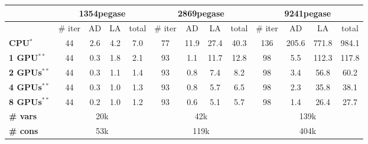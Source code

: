 \begin{tabular}{|l|cccc|cccc|cccc|}
  \hline
  &
    \multicolumn{4}{c|}{\bf 1354pegase}
  &
    \multicolumn{4}{c|}{\bf 2869pegase}
  &
    \multicolumn{4}{c|}{\bf 9241pegase} \\
  \hline
  &
    \# iter
  & AD
  & LA
  & total
  &
    \# iter
  & AD
  & LA
  & total
  &
    \# iter
  & AD
  & LA
  & total \\
  \hline
  {\bf CPU$^{*}$}
  &
    44
  & 2.6
  & 4.2
  & {7.0}
  &
    77
  & 11.9
  & 27.4
  & {40.3}
  &
    136
  & 205.6
  & 771.8
  & {984.1} \\
  {\bf 1 GPU$^{**}$}
  &
    44
  & 0.3
  & 1.8
  & {2.1}
  &
    93
  & 1.1
  & 11.7
  & {12.8}
  &
    98
  & 5.5
  & 112.3
  & {117.8}\\
  {\bf 2 GPUs$^{**}$}
  &
    44
  & 0.3
  & 1.1
  & {1.4}
  &
    93
  & 0.8
  & 7.4
  & {8.2}
  &
    98
  & 3.4
  & 56.8
  & {60.2}\\
  {\bf 4 GPUs$^{**}$}
  &
    44
  & 0.3
  & 1.0
  & {1.3}
  &
    93
  & 0.8
  & 5.7
  & {6.5}
  &
    98
  & 2.3
  & 35.8
  & {38.1}\\
  {\bf 8 GPUs$^{**}$}
  &
    44
  & 0.2
  & 1.0
  & {1.2}
  &
    93
  & 0.6
  & 5.1
  & {5.7}
  &
    98
  & 1.4
  & 26.4
  & {27.7}\\
  \hline
  {\bf \# vars} & \multicolumn{4}{c|}{20k} & \multicolumn{4}{c|}{42k} & \multicolumn{4}{c|}{139k}\\
  {\bf \# cons} & \multicolumn{4}{c|}{53k} & \multicolumn{4}{c|}{119k} & \multicolumn{4}{c|}{404k}\\
  \hline
\end{tabular}